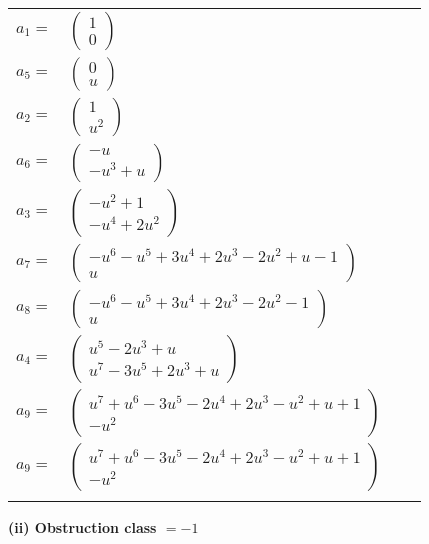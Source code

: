 \documentclass[1p]{elsarticle_modified}
\theoremstyle{definition}
\begin{document}
\begin{tabular}{m{7pt} m{180pt} m{7pt} m{180pt} }
\flushright $a_{1}=$&$\begin{pmatrix}1\\0\end{pmatrix}$ \\
\flushright $a_{5}=$&$\begin{pmatrix}0\\u\end{pmatrix}$ \\
\flushright $a_{2}=$&$\begin{pmatrix}1\\u^2\end{pmatrix}$ \\
\flushright $a_{6}=$&$\begin{pmatrix}- u\\- u^3+u\end{pmatrix}$ \\
\flushright $a_{3}=$&$\begin{pmatrix}- u^2+1\\- u^4+2 u^2\end{pmatrix}$ \\
\flushright $a_{7}=$&$\begin{pmatrix}- u^6- u^5+3 u^4+2 u^3-2 u^2+u-1\\u\end{pmatrix}$ \\
\flushright $a_{8}=$&$\begin{pmatrix}- u^6- u^5+3 u^4+2 u^3-2 u^2-1\\u\end{pmatrix}$ \\
\flushright $a_{4}=$&$\begin{pmatrix}u^5-2 u^3+u\\u^7-3 u^5+2 u^3+u\end{pmatrix}$ \\
\flushright $a_{9}=$&$\begin{pmatrix}u^7+u^6-3 u^5-2 u^4+2 u^3- u^2+u+1\\- u^2\end{pmatrix}$\\ \flushright $a_{9}=$&$\begin{pmatrix}u^7+u^6-3 u^5-2 u^4+2 u^3- u^2+u+1\\- u^2\end{pmatrix}$\\&\end{tabular}
\flushleft \textbf{(ii) Obstruction class $= -1$}\\~\\
\end{document}
